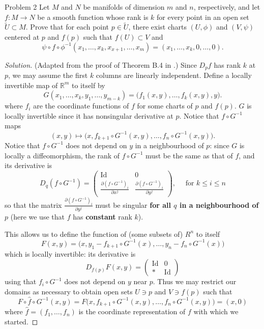 \begin{thing1}{Problem 2}\label{p:2}\leavevmode
Let \(M\) and $N$ be manifolds of dimension $m$ and $n$, respectively, and let \(f:M \to N\) be a smooth function whose rank is \(k\) for every point in an open set \(\tilde{U} \subset M\). Prove that for each point \(p \in \tilde{U}\), there exist charts \((U, \phi)\) and \((V,\psi)\) centered at \(p\) and \(f(p)\) such that \(f(U) \subset V\) and
\[\psi \circ f \circ \phi^{-1}(x_1,\ldots,x_k,x_{x+1},\ldots,x_m)=(x_1,\ldots,x_k,0,\ldots,0).\]
\end{thing1}

\begin{proof}[Solution]\leavevmode
	(Adapted from the proof of Theorem B.4 in \cite{tus}.) Since \(D_{p}f\) has rank \(k\) at \(p\), we may assume the first \(k\) columns are linearly independent. Define a locally invertible map of \(\mathbb{R}^m\) to itself by
\[G(x_1,\ldots,x_k,y_1,\ldots,y_{m-k})=\Big(f_1(x,y),\ldots,f_k(x,y),y\Big).\]
where \(f_i\) are the coordinate functions of $f$ for some charts of \(p\) and \(f(p)\). \(G\) is locally invertible since it has nonsingular derivative at \(p\). Notice that \(f \circ G^{-1}\) maps 
\[(x,y) \mapsto \Big(x,f_{k+1} \circ G^{-1}(x,y),\ldots,f_{n} \circ G^{-1}(x,y)\Big).\]
{\color{6}Notice that \(f \circ G^{-1}\) does not depend on \(y\) in a neighbourhood of \(p\):} since \(G\) is locally a diffeomorphism, the rank of \(f \circ G^{-1}\) must be the same as that of \(f\), and its derivative is
\[D_q(f \circ G^{-1})=\begin{pmatrix}\operatorname{Id}&0\\ \frac{\partial (f \circ G^{-1})_i}{\partial x^j} &\frac{\partial (f \circ G^{-1})_i}{\partial y^j}\end{pmatrix},\quad\text{ for }  k \leq i \leq n\]
so that the matrix \(\frac{\partial (f \circ G^{-1})_i}{\partial y^j}\) must be singular \textbf{for all $q$ in a neighbourhood of $p$} (here we use that $f$ has \textbf{constant} rank \(k\)).

This allows us to define the function of (some subsets of) \(R^n\) to itself
\[F(x,y)=\Big(x,y_1-f_{k+1}\circ G^{-1}(x),\ldots,y_n-f_n \circ G^{-1}(x) \Big) \]
which is locally invertible: its derivative is
\[D_{f(p)}F(x,y)=\begin{pmatrix}\operatorname{Id}&0\\ *&\operatorname{Id}\end{pmatrix}\]
using that \(f_i \circ G^{-1}\) does not depend on \(y\) near $p$. Thus we may restrict our domains as necessary to obtain open sets  \(U \ni p\) and \(V \ni f(p)\) such that
\[F \circ \hat{f} \circ G^{-1}(x,y)=F\Big(x,f_{k+1} \circ G^{-1}(x,y),\ldots,f_{n} \circ G^{-1}(x,y)\Big)=(x,0)\]
where \(\hat{f}=(f_1,\ldots,f_n)\) is the coordinate representation of $f$ with which we started.

\end{proof}
